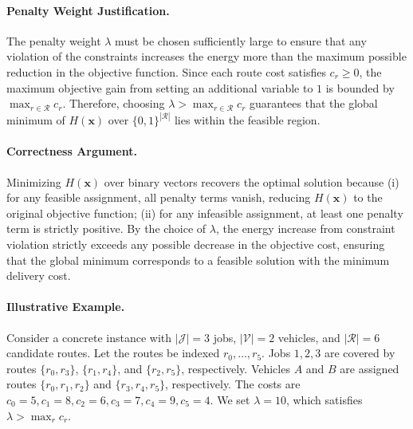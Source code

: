 \documentclass[12pt]{article}
\begin{document}
\paragraph{Penalty Weight Justification.}
The penalty weight $\lambda$ must be chosen sufficiently large to ensure that any violation of the constraints increases the energy more than the maximum possible reduction in the objective function. Since each route cost satisfies $c_r \ge 0$, the maximum objective gain from setting an additional variable to $1$ is bounded by $\max_{r \in \mathcal{R}} c_r$. Therefore, choosing $\lambda > \max_{r \in \mathcal{R}} c_r$ guarantees that the global minimum of $H(\mathbf{x})$ over $\{0,1\}^{|\mathcal{R}|}$ lies within the feasible region.

\paragraph{Correctness Argument.}
Minimizing $H(\mathbf{x})$ over binary vectors recovers the optimal solution because (i) for any feasible assignment, all penalty terms vanish, reducing $H(\mathbf{x})$ to the original objective function; (ii) for any infeasible assignment, at least one penalty term is strictly positive. By the choice of $\lambda$, the energy increase from constraint violation strictly exceeds any possible decrease in the objective cost, ensuring that the global minimum corresponds to a feasible solution with the minimum delivery cost.

\paragraph{Illustrative Example.}
Consider a concrete instance with $|\mathcal{J}| = 3$ jobs, $|\mathcal{V}| = 2$ vehicles, and $|\mathcal{R}| = 6$ candidate routes. Let the routes be indexed $r_0, \dots, r_5$. Jobs $1, 2, 3$ are covered by routes $\{r_0, r_3\}$, $\{r_1, r_4\}$, and $\{r_2, r_5\}$, respectively. Vehicles $A$ and $B$ are assigned routes $\{r_0, r_1, r_2\}$ and $\{r_3, r_4, r_5\}$, respectively. The costs are $c_0=5, c_1=8, c_2=6, c_3=7, c_4=9, c_5=4$. We set $\lambda = 10$, which satisfies $\lambda > \max_r c_r$.
\end{document}
